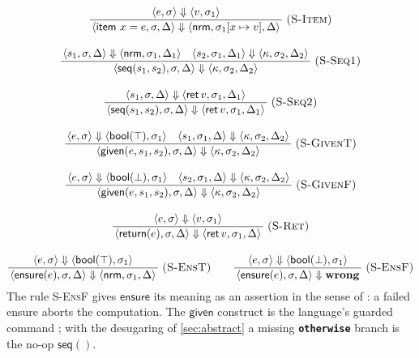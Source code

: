 \documentclass[11pt,a4paper]{article}
\theoremstyle{plain}
\theoremstyle{definition}
\theoremstyle{remark}
\newcommand{\tm}[1]{\textbf{\texttt{#1}}}                 %
\newcommand{\rn}[1]{\textsc{#1}}                          %
\newcommand{\evalto}{\Downarrow}
\newcommand{\env}{\sigma}
\newcommand{\nrm}{\mathsf{nrm}}
\newcommand{\ret}{\mathsf{ret}}
\newcommand{\wrong}{\mathbf{wrong}}
\newcommand{\infrule}[3]{%
  \ensuremath{\displaystyle\frac{\,#2\,}{\,#3\,}}\;\rn{(#1)}}
\newcommand{\jspace}{\qquad}
\begin{document}
\begin{gather*}
\infrule{S-Item}{\langle e,\env\rangle\evalto\langle v,\env_1\rangle}
               {\langle \mathsf{item}\ x=e,\env,\Delta\rangle\evalto
                \langle \nrm,\env_1[x\mapsto v],\Delta\rangle}\\[10pt]
\infrule{S-Seq1}{\langle s_1,\env,\Delta\rangle\evalto\langle\nrm,\env_1,
                 \Delta_1\rangle\quad
                 \langle s_2,\env_1,\Delta_1\rangle\evalto\langle\kappa,\env_2,
                 \Delta_2\rangle}
                {\langle \mathsf{seq}(s_1,s_2),\env,\Delta\rangle\evalto
                 \langle\kappa,\env_2,\Delta_2\rangle}\\[10pt]
\infrule{S-Seq2}{\langle s_1,\env,\Delta\rangle\evalto\langle\ret\,v,\env_1,
                 \Delta_1\rangle}
                {\langle \mathsf{seq}(s_1,s_2),\env,\Delta\rangle\evalto
                 \langle\ret\,v,\env_1,\Delta_1\rangle}\\[10pt]
\infrule{S-GivenT}{\langle e,\env\rangle\evalto\langle\mathsf{bool}(\top),
                   \env_1\rangle\quad
                   \langle s_1,\env_1,\Delta\rangle\evalto\langle\kappa,\env_2,
                   \Delta_2\rangle}
                  {\langle\mathsf{given}(e,s_1,s_2),\env,\Delta\rangle\evalto
                   \langle\kappa,\env_2,\Delta_2\rangle}\\[10pt]
\infrule{S-GivenF}{\langle e,\env\rangle\evalto\langle\mathsf{bool}(\bot),
                   \env_1\rangle\quad
                   \langle s_2,\env_1,\Delta\rangle\evalto\langle\kappa,\env_2,
                   \Delta_2\rangle}
                  {\langle\mathsf{given}(e,s_1,s_2),\env,\Delta\rangle\evalto
                   \langle\kappa,\env_2,\Delta_2\rangle}\\[10pt]
\infrule{S-Ret}{\langle e,\env\rangle\evalto\langle v,\env_1\rangle}
              {\langle\mathsf{return}(e),\env,\Delta\rangle\evalto\langle
               \ret\,v,\env_1,\Delta\rangle}\\[10pt]
\infrule{S-EnsT}{\langle e,\env\rangle\evalto\langle\mathsf{bool}(\top),
                 \env_1\rangle}
                {\langle\mathsf{ensure}(e),\env,\Delta\rangle\evalto\langle
                 \nrm,\env_1,\Delta\rangle}\jspace
\infrule{S-EnsF}{\langle e,\env\rangle\evalto\langle\mathsf{bool}(\bot),
                 \env_1\rangle}
                {\langle\mathsf{ensure}(e),\env,\Delta\rangle\evalto\wrong}
\end{gather*}
The rule \rn{S-EnsF} gives $\mathsf{ensure}$ its meaning as an assertion in the
sense of \citet{hoare1969}: a failed ensure aborts the computation. The
$\mathsf{given}$ construct is the language's guarded command
\citep{dijkstra1975}; with the desugaring of \cref{sec:abstract} a missing
\tm{otherwise} branch is the no-op $\mathsf{seq}()$.
\end{document}
